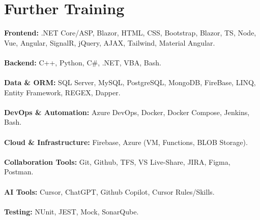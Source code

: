 \documentclass[letterpaper]{twentysecondcv} %
\begin{document}
\section{Further Training}
{
   {\textbf{Frontend:}} .NET Core/ASP, Blazor, HTML, CSS, Bootstrap, Blazor, TS, Node, Vue, Angular, SignalR, jQuery, AJAX, Tailwind, Material Angular.\\\\
   {\textbf{Backend:}} C++, Python, C\#, .NET, VBA, Bash.\\\\
   {\textbf{Data \& ORM:}} SQL Server, MySQL, PostgreSQL, MongoDB, FireBase, LINQ, Entity Framework, REGEX, Dapper.\\\\
   {\textbf{DevOps \& Automation:}} Azure DevOps, Docker, Docker Compose, Jenkins, Bash.\\\\
   {\textbf{Cloud \& Infrastructure:}} Firebase, Azure (VM, Functions, BLOB Storage).\\\\
   {\textbf{Collaboration Tools:}} Git, Github, TFS, VS Live-Share, JIRA, Figma, Postman.\\\\
   {\textbf{AI Tools:}} Cursor, ChatGPT, Github Copilot, Cursor Rules/Skills.\\\\
   {\textbf{Testing:}} NUnit, JEST, Mock, SonarQube.
}
\end{document}
